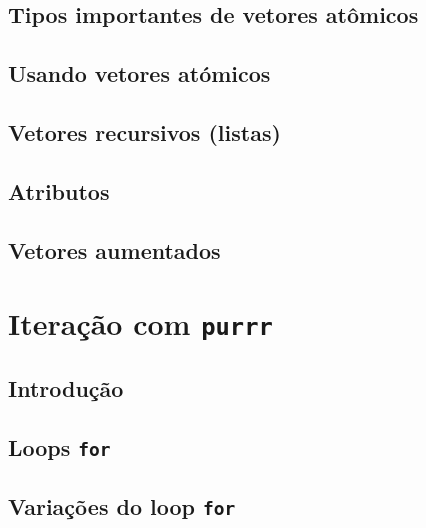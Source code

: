 \documentclass[
]{latex/krantz}
\theoremstyle{definition}
\theoremstyle{definition}
\theoremstyle{definition}
\theoremstyle{definition}
\theoremstyle{remark}
\begin{document}
\hypertarget{tipos-importantes-de-vetores-atuxf4micos}{%
\section{Tipos importantes de vetores atômicos}\label{tipos-importantes-de-vetores-atuxf4micos}}

\hypertarget{usando-vetores-atuxf3micos}{%
\section{Usando vetores atómicos}\label{usando-vetores-atuxf3micos}}

\hypertarget{vetores-recursivos-listas}{%
\section{Vetores recursivos (listas)}\label{vetores-recursivos-listas}}

\hypertarget{atributos}{%
\section{Atributos}\label{atributos}}

\hypertarget{vetores-aumentados}{%
\section{Vetores aumentados}\label{vetores-aumentados}}

\hypertarget{iterauxe7uxe3o-com-purrr}{%
\chapter{\texorpdfstring{Iteração com \texttt{purrr}}{Iteração com purrr}}\label{iterauxe7uxe3o-com-purrr}}

\hypertarget{introduuxe7uxe3o-13}{%
\section{Introdução}\label{introduuxe7uxe3o-13}}

\hypertarget{loops-for}{%
\section{\texorpdfstring{Loops \texttt{for}}{Loops for}}\label{loops-for}}

\hypertarget{variauxe7uxf5es-do-loop-for}{%
\section{\texorpdfstring{Variações do loop \texttt{for}}{Variações do loop for}}\label{variauxe7uxf5es-do-loop-for}}
\end{document}
